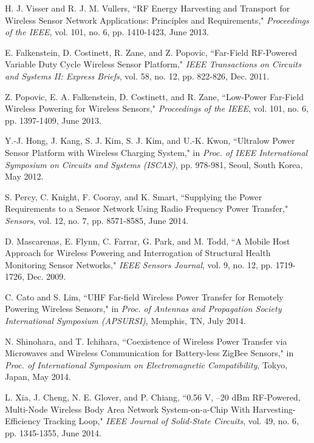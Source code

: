 \documentclass[twocolumn,10pt]{IEEEtran}
\begin{document}
\begin{thebibliography}{99}
H. J. Visser and R. J. M. Vullers, ``RF Energy Harvesting and Transport for Wireless Sensor Network Applications: Principles and Requirements," \emph{Proceedings of the IEEE}, vol. 101, no. 6, pp. 1410-1423, June 2013. 

E. Falkenstein, D. Costinett, R. Zane, and Z. Popovic, ``Far-Field RF-Powered Variable Duty Cycle Wireless Sensor Platform," \emph{IEEE Transactions on Circuits and Systems II: Express Briefs}, vol. 58, no. 12, pp. 822-826, Dec. 2011.

Z. Popovic, E. A. Falkenstein, D. Costinett, and R. Zane, ``Low-Power Far-Field Wireless Powering for Wireless Sensors," \emph{Proceedings of the IEEE}, vol. 101, no. 6, pp. 1397-1409, June 2013.

Y.-J. Hong, J. Kang, S. J. Kim, S. J. Kim, and U.-K. Kwon, ``Ultralow Power Sensor Platform with Wireless Charging System," in \emph{Proc. of IEEE International Symposium on Circuits and Systems (ISCAS)}, pp. 978-981, Seoul, South Korea, May 2012.



S. Percy, C. Knight, F. Cooray, and K. Smart, ``Supplying the Power Requirements to a Sensor Network Using Radio Frequency Power Transfer," \emph{Sensors}, vol. 12, no. 7, pp. 8571-8585, June 2014.



D. Mascarenas, E. Flynn, C. Farrar, G. Park, and M. Todd, ``A Mobile Host Approach for Wireless Powering and Interrogation of Structural Health Monitoring Sensor Networks," \emph{IEEE Sensors Journal}, vol. 9, no. 12, pp. 1719-1726, Dec. 2009.





C. Cato and S. Lim, ``UHF Far-field Wireless Power Transfer for Remotely Powering Wireless Sensors," in \emph{Proc. of Antennas and Propagation Society International Symposium (APSURSI)}, Memphis, TN, July 2014.

N. Shinohara, and T. Ichihara, ``Coexistence of Wireless Power Transfer via Microwaves and Wireless Communication for Battery-less ZigBee Sensors," in \emph{Proc. of International Symposium on Electromagnetic Compatibility}, Tokyo, Japan, May 2014.  

L. Xia, J. Cheng, N. E. Glover, and P. Chiang, ``0.56 V, –20 dBm RF-Powered, Multi-Node Wireless Body Area Network System-on-a-Chip With Harvesting-Efficiency Tracking Loop," \emph{IEEE Journal of Solid-State Circuits}, vol.	49, no. 6, pp. 1345-1355, June 2014.



\end{thebibliography}
\end{document}
